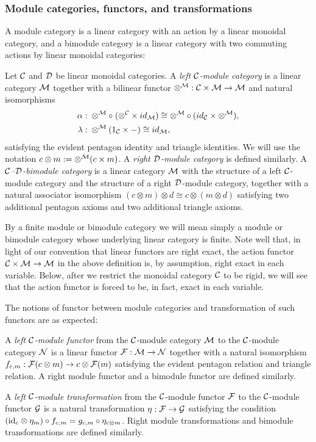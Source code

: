 \documentclass{amsart}
\begin{document}
\subsubsection{Module categories, functors, and transformations}

A module category is a linear category with an action by a linear monoidal category, and a bimodule category is a linear category with two commuting actions by linear monoidal categories:
\begin{definition}
Let $\mathcal C$ and $\mathcal D$ be linear monoidal categories.
A \emph{left $\mathcal C$-module category} is a linear category $\mathcal M$ together with a bilinear functor $\otimes^{\mathcal M}: \mathcal C \times \mathcal M \to \mathcal M$ and natural isomorphisms
\begin{align*}
		\alpha: & \;    \otimes^{\mathcal M} \circ \; (\otimes^{\mathcal C} \times id_{\mathcal M}) \cong  \otimes^{\mathcal M} \circ (id_{\mathcal C} \times \otimes^{\mathcal M}), \\
		\lambda: & \; \otimes^{\mathcal M} (1_{\mathcal C} \times -) \cong id_{\mathcal M},
\end{align*}
satisfying the evident pentagon identity and triangle identities.  We will use the notation $c \otimes m := \otimes^\mathcal M(c \times m)$.  A \emph{right $\mathcal D$-module category} is defined similarly.  A \emph{$\mathcal C$--$\mathcal D$-bimodule category} is a linear category $\mathcal M$ with the structure of a left $\mathcal C$-module category and the structure of a right $\mathcal D$-module category, together with a natural associator isomorphism $(c \otimes m) \otimes d \cong c \otimes (m \otimes d)$ satisfying two additional pentagon axioms and two additional triangle axioms.  
\end{definition}
\nid By a finite module or bimodule category we will mean simply a module or bimodule category whose underlying linear category is finite.  Note well that, in light of our convention that linear functors are right exact, the action functor $\mathcal C \times \mathcal M \rightarrow \mathcal M$ in the above definition is, by assumption, right exact in each variable.  Below, after we restrict the monoidal category $\mathcal C$ to be rigid, we will see that the action functor is forced to be, in fact, exact in each variable.

The notions of functor between module categories and transformation of such functors are as expected:
\begin{definition}
A \emph{left $\mathcal C$-module functor} from the $\mathcal C$-module category $\mathcal M$ to the $\mathcal C$-module category $\mathcal N$ is a linear functor $\mathcal F: \mathcal M \rightarrow \mathcal N$ together with a natural isomorphism $f_{c,m}:\mathcal F(c \otimes m) \rightarrow c \otimes \mathcal F(m)$ satisfying the evident pentagon relation and triangle relation.  A right module functor and a bimodule functor are defined similarly.
\end{definition}
\begin{definition}
A \emph{left $\mathcal C$-module transformation} from the $\mathcal C$-module functor $\mathcal F$ to the $\mathcal C$-module functor $\mathcal G$ is a natural transformation $\eta: \mathcal F \rightarrow \mathcal G$ satisfying the condition $(\mathrm{id}_c \otimes \eta_m) \circ f_{c,m} = g_{c,m} \circ \eta_{c \otimes m}$.  Right module transformations and bimodule transformations are defined similarly.
\end{definition}
\end{document}
